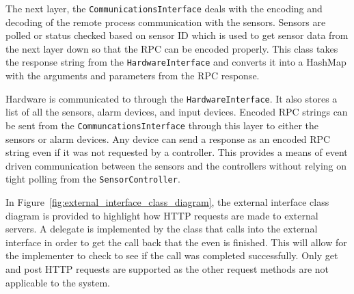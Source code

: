 \documentclass{report}
\begin{document}
The next layer, the \texttt{CommunicationsInterface} deals with the encoding
and decoding of the remote process communication with the sensors. Sensors are
polled or status checked based on sensor ID which is used to get sensor data
from the next layer down so that the RPC can be encoded properly. This class
takes the response string from the \texttt{HardwareInterface} and converts it
into a HashMap with the arguments and parameters from the RPC response.

Hardware is communicated to through the \texttt{HardwareInterface}. It also
stores a list of all the sensors, alarm devices, and input devices. Encoded RPC
strings can be sent from the \texttt{CommuncationsInterface} through this layer
to either the sensors or alarm devices. Any device can send a response as an
encoded RPC string even if it was not requested by a controller. This provides
a means of event driven communication between the sensors and the controllers
without relying on tight polling from the \texttt{SensorController}.

In Figure~\ref{fig:external_interface_class_diagram}, the external interface
class diagram is provided to highlight how HTTP requests are made to external
servers. A delegate is implemented by the class that calls into the external
interface in order to get the call back that the even is finished. This will
allow for the implementer to check to see if the call was completed
successfully. Only get and post HTTP requests are supported as the other request
methods are not applicable to the system.
\end{document}
